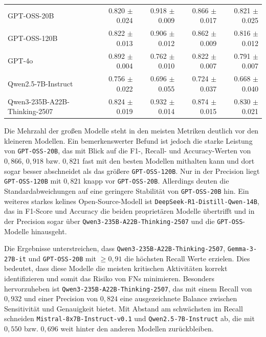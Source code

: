 \begin{table}[htbp]
\begin{adjustbox}{width=\textwidth}
\begin{tabular}{l r r r r}
            GPT-OSS-20B & 0.820 $\pm$ 0.024 & 0.918 $\pm$ 0.009 & 0.866 $\pm$ 0.017 & 0.821 $\pm$ 0.025 \\
            GPT-OSS-120B & 0.822 $\pm$ 0.013 & 0.906 $\pm$ 0.012 & 0.862 $\pm$ 0.009 & 0.816 $\pm$ 0.012 \\
            GPT-4o & 0.892 $\pm$ 0.004 & 0.762 $\pm$ 0.010 & 0.822 $\pm$ 0.007 & 0.791 $\pm$ 0.007 \\
            Qwen2.5-7B-Instruct & 0.756 $\pm$ 0.022 & 0.696 $\pm$ 0.055 & 0.724 $\pm$ 0.037 & 0.668 $\pm$ 0.040 \\
            Qwen3-235B-A22B-Thinking-2507 & 0.824 $\pm$ 0.019 & 0.932 $\pm$ 0.014 & 0.874 $\pm$ 0.015 & 0.830 $\pm$ 0.021 \\
            \bottomrule
        \end{tabular}
    \end{adjustbox}
\end{table}

Die Mehrzahl der großen Modelle steht in den meisten Metriken deutlich vor den kleineren Modellen. Ein bemerkenswerter Befund ist jedoch die starke Leistung von \texttt{GPT-OSS-20B}, das mit Blick auf die F1-, Recall- und Accuracy-Werten von $0{,}866$, $0{,}918$ bzw. $0{,}821$ fast mit den besten Modellen mithalten kann und dort sogar besser abschneidet als das größere \texttt{GPT-OSS-120B}. Nur in der Precision liegt \texttt{GPT-OSS-120B} mit $0{,}821$ knapp vor \texttt{GPT-OSS-20B}. Allerdings deuten die Standardabweichungen auf eine geringere Stabilität von \texttt{GPT-OSS-20B} hin. Ein weiteres starkes kelines Open-Source-Modell ist \texttt{DeepSeek-R1-Distill-Qwen-14B}, das in F1-Score und Accuracy die
beiden proprietären Modelle übertrifft und in der Precision sogar über \texttt{Qwen3-235B-A22B-Thinking-2507} und die \texttt{GPT-OSS}-Modelle hinausgeht.

Die Ergebnisse unterstreichen, dass \texttt{Qwen3-235B-A22B-Thinking-2507}, \texttt{Gemma-3-27B-it} und \texttt{GPT-OSS-20B} mit $\geq 0{,}91$ die höchsten Recall Werte erzielen. Dies bedeutet, dass diese Modelle die meisten kritischen Aktivitäten korrekt identifizieren und somit das Risiko von \acp{FN} minimieren. Besonders hervorzuheben ist \texttt{Qwen3-235B-A22B-Thinking-2507}, das mit einem Recall von $0{,}932$ und einer Precision von $0{,}824$ eine ausgezeichnete Balance zwischen Sensitivität und Genauigkeit bietet. Mit Abstand am schwächsten im Recall schneiden \texttt{Mistral-8x7B-Instruct-v0.1} und \texttt{Qwen2.5-7B-Instruct} ab, die mit $0{,}550$ bzw. $0{,}696$ weit hinter den anderen Modellen zurückbleiben.

